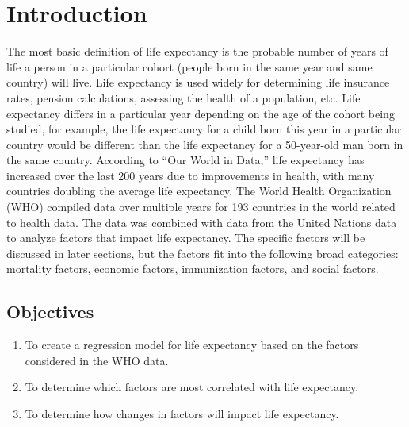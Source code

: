\section{Introduction}
The most basic definition of life expectancy is the probable number of years of life a person in a particular cohort (people born in the same year and same country) will live. Life expectancy is used widely for determining life insurance rates, pension calculations, assessing the health of a population, etc. Life expectancy differs in a particular year depending on the age of the cohort being studied, for example, the life expectancy for a child born this year in a particular country would be different than the life expectancy for a 50-year-old man born in the same country. According to “Our World in Data,” life expectancy has increased over the last 200 years due to improvements in health, with many countries doubling the average life expectancy. 
The World Health Organization (WHO) compiled data over multiple years for 193 countries in the world related to health data. The data was combined with data from the United Nations data to analyze factors that impact life expectancy. The specific factors will be discussed in later sections, but the factors fit into the following broad categories: mortality factors, economic factors, immunization factors, and social factors. 

\subsection{Objectives}
\label{objectives}


\begin{enumerate}
\item To create a regression model for life expectancy based on the factors considered in the WHO data.
\item To determine which factors are most correlated with life expectancy.
\item To determine how changes in factors will impact life expectancy.   
\end{enumerate}


